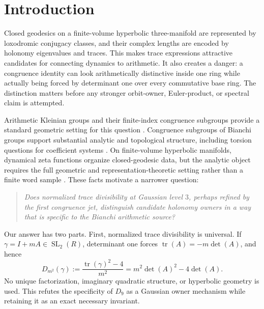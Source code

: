 \documentclass[11pt,a4paper]{article}
\theoremstyle{definition}
\theoremstyle{remark}
\newcommand{\SL}{\operatorname{SL}}
\newcommand{\tr}{\operatorname{tr}}
\begin{document}
\section{Introduction}

Closed geodesics on a finite-volume hyperbolic three-manifold are represented by loxodromic conjugacy classes, and their complex lengths are encoded by holonomy eigenvalues and traces. This makes trace expressions attractive candidates for connecting dynamics to arithmetic. It also creates a danger: a congruence identity can look arithmetically distinctive inside one ring while actually being forced by determinant one over every commutative base ring. The distinction matters before any stronger orbit-owner, Euler-product, or spectral claim is attempted.

Arithmetic Kleinian groups and their finite-index congruence subgroups provide a standard geometric setting for this question \citep[Chs.~10--11]{MaclachlanReid2003}.
Congruence subgroups of Bianchi groups support substantial analytic and topological structure, including torsion questions for coefficient systems \citep[Introduction and Sec.~2]{PfaffRaimbault2020}.
On finite-volume hyperbolic manifolds, dynamical zeta functions organize closed-geodesic data, but the analytic object requires the full geometric and representation-theoretic setting rather than a finite word sample \citep[abstract and Secs.~3--5]{Pfaff2015}. These facts motivate a narrower question:

\begin{quote}
\emph{Does normalized trace divisibility at Gaussian level \(3\), perhaps refined by the first congruence jet, distinguish candidate holonomy owners in a way that is specific to the Bianchi arithmetic source?}
\end{quote}

Our answer has two parts. First, normalized trace divisibility is universal. If \(\gamma=I+mA\in\SL_2(R)\), determinant one forces \(\tr(A)=-m\det(A)\), and hence
\[
 D_{m^2}(\gamma):=\frac{\tr(\gamma)^2-4}{m^2}
 =m^2\det(A)^2-4\det(A).
\]
No unique factorization, imaginary quadratic structure, or hyperbolic geometry is used. This refutes the specificity of \(D_9\) as a Gaussian owner mechanism while retaining it as an exact necessary invariant.
\end{document}
